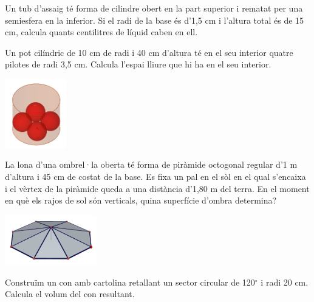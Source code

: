 \begin{activitats}
\begin{mylist}

\exer  Un tub d'assaig té forma de cilindre obert en la part superior i rematat per una semiesfera en la inferior. Si el radi de la base és d'1,5 cm i l'altura total és de 15 cm, calcula quants centilitres de líquid caben en ell. 


\exer  Un pot cilíndric de 10 cm de radi i 40 cm d'altura té en el seu interior quatre pilotes de radi 3,5 cm. Calcula l'espai lliure que hi ha en el seu interior.

\begin{center}
\includegraphics[width=0.2\textwidth]{img-11/ous}
\end{center}


\exer  La lona d'una ombrel·la oberta té forma de piràmide octogonal regular \linebreak d'1 m d'altura i 45 cm de costat de la base. Es fixa un pal en el sòl en el qual s'encaixa i el vèrtex de la piràmide queda a una distància d'1,80 m del terra. En el moment en què els rajos de sol són verticals, quina superfície d'ombra determina?  
\begin{center}
	\includegraphics[width=0.3\textwidth]{img-11/lona}
\end{center}


\exer  Construïm un con amb cartolina retallant un sector circular de 120${}^\circ$ i radi 20 cm. Calcula el volum del con resultant.



\end{mylist}
\end{activitats}
